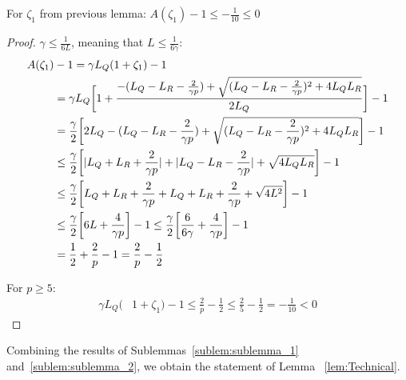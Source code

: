 \begin{sublemma}\label{sublem:sublemma_2}
    For $\zeta_1$ from previous lemma: $A(\zeta_1) - 1 \leq -\frac{1}{10} \leq 0$
\end{sublemma}
\begin{proof}
    $\gamma \leq \frac{1}{6 L}$, meaning that $L \leq \frac{1}{6 \gamma }$:
    \begin{align}
        A(\zeta_1)& - 1 = \gamma L_Q(1+\zeta_1) - 1 \\
        &= \gamma L_Q 
        \biggr[ 1 + \frac{-(L_Q - L_R - \frac{2}{\gamma p})+\sqrt{(L_Q - L_R -\frac{2}{\gamma p})^2 + 4 L_Q L_R}}{2L_Q}  \biggr] - 1\\
        &=
        \frac{\gamma}{2} 
        \biggr[ 2L_Q - (L_Q - L_R - \frac{2}{\gamma p}) + \sqrt{(L_Q - L_R - \frac{2}{\gamma p})^2 + 4 L_Q L_R}  \biggr] - 1\\ 
        & \leq
        \frac{\gamma}{2} 
        \biggr[ |L_Q + L_R + \frac{2}{\gamma p}| + |L_Q - L_R - \frac{2}{\gamma p}| + \sqrt{ 4 L_Q L_R}  \biggr] - 1\\
        & \leq
        \frac{\gamma}{2} 
        \biggr[ L_Q + L_R + \frac{2}{\gamma p} + L_Q + L_R + \frac{2}{\gamma p} + \sqrt{ 4 L^2}  \biggr] - 1\\
        & \leq
        \frac{\gamma}{2} 
        \biggr[ 6 L + \frac{4}{\gamma p}  \biggr] - 1
        \leq
        \frac{\gamma}{2} 
        \biggr[ \frac{6}{6 \gamma} + \frac{4}{\gamma p}  \biggr] - 1 \\
        &=
        \frac{1}{2} + \frac{2}{p} - 1
        = \frac{2}{p} - \frac{1}{2}
    \end{align}
    
    For $p \geq 5$:
    \begin{align}
         \gamma L_Q(&1+\zeta_1) - 1 \leq \frac{2}{p} - \frac{1}{2} \leq \frac{2}{5} - \frac{1}{2} 
         = -\frac{1}{10} < 0 \label{eq:St_6}
    \end{align}
\end{proof}

Combining the results of Sublemmas~\ref{sublem:sublemma_1} and~\ref{sublem:sublemma_2}, 
we obtain the statement of Lemma ~\ref{lem:Technical}.



